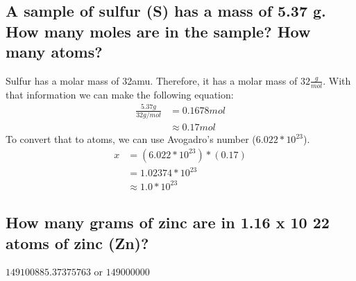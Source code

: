 \documentclass[11pt]{article}
\begin{document}
\subsection{A sample of sulfur (S) has a mass of 5.37 g. How many moles are in the sample? How many atoms?}
\label{sec:org8c773cd}
Sulfur has a molar mass of 32amu. Therefore, it has a molar mass of
\(32\frac{g}{mol}\).
With that information we can make the following equation:
\begin{align*}
\frac{5.37g}{32g/mol}&=0.1678mol\\
&\approx0.17mol
\end{align*}
To convert that to atoms, we can use Avogadro's number (\(6.022 *10^{23}\)).
\begin{align*}
x&=(6.022*10^{23})*(0.17)\\
&=1.02374*10^{23}\\
&\approx1.0*10^{23}
\end{align*}

\subsection{How many grams of zinc are in 1.16 x 10 22 atoms of zinc (Zn)?}
\label{sec:org3cd2056}
\(149100885.37375763\) or \(149000000\)
\end{document}
